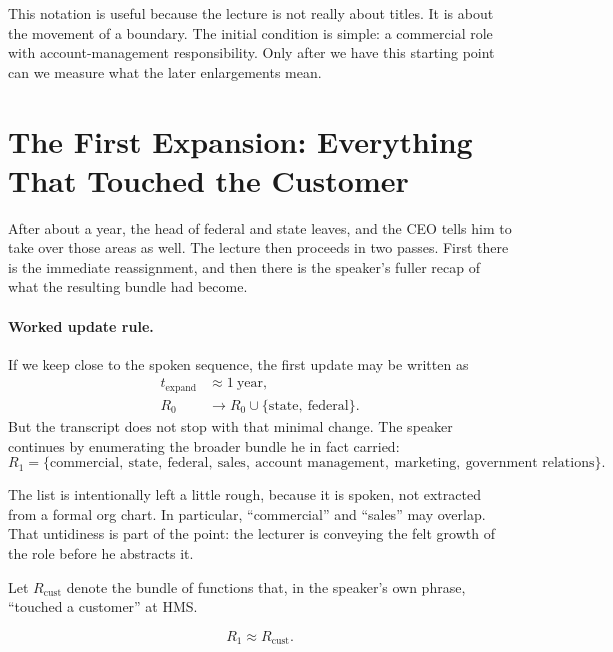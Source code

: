 This notation is useful because the lecture is not really about titles. It is about the movement of a boundary. The initial condition is simple: a commercial role with account-management responsibility. Only after we have this starting point can we measure what the later enlargements mean.

\section{The First Expansion: Everything That Touched the Customer}

After about a year, the head of federal and state leaves, and the CEO tells him to take over those areas as well. The lecture then proceeds in two passes. First there is the immediate reassignment, and then there is the speaker's fuller recap of what the resulting bundle had become.

\paragraph{Worked update rule.}
If we keep close to the spoken sequence, the first update may be written as
\begin{align}
t_{\mathrm{expand}} &\approx 1\ \text{year},\\
R_0 &\longrightarrow R_0 \cup \{\text{state},\ \text{federal}\}.
\end{align}
But the transcript does not stop with that minimal change. The speaker continues by enumerating the broader bundle he in fact carried:
\begin{equation}
R_1 =
\{\text{commercial},\ \text{state},\ \text{federal},\ \text{sales},\ \text{account management},\ \text{marketing},\ \text{government relations}\}.
\end{equation}

The list is intentionally left a little rough, because it is spoken, not extracted from a formal org chart. In particular, ``commercial'' and ``sales'' may overlap. That untidiness is part of the point: the lecturer is conveying the felt growth of the role before he abstracts it.

\begin{definition}
Let \(R_{\mathrm{cust}}\) denote the bundle of functions that, in the speaker's own phrase, ``touched a customer'' at HMS.
\end{definition}

\begin{equation}
R_1 \approx R_{\mathrm{cust}}.
\end{equation}

